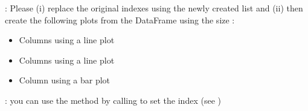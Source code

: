 \documentclass[letterpaper,10pt,english]{jupyterBook}
\begin{document}
\sphinxAtStartPar
{}: Please (i) replace the original indexes using the newly created list  and (ii) then create the following plots from the DataFrame  using the size :
\begin{itemize}
\item {} 
\sphinxAtStartPar
Columns \sphinxcode{\sphinxupquote{{[}'St','CumulativeActual'{]}}} using a line plot

\item {} 
\sphinxAtStartPar
Columns \sphinxcode{\sphinxupquote{{[}'st','Actual'{]}}} using a line plot

\item {} 
\sphinxAtStartPar
Column \sphinxcode{\sphinxupquote{{[}'PError'{]}}} using a bar plot

\end{itemize}

\sphinxAtStartPar
{}: you can use the method  by calling  to set the index (see )
\end{document}
